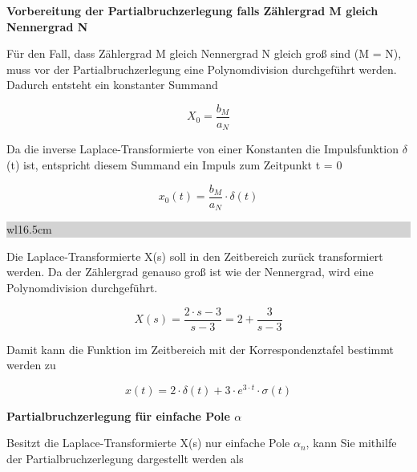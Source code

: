 {\selectfont
\noindent\textbf{Vorbereitung der Partialbruchzerlegung falls Zählergrad M gleich Nennergrad N}}\smallskip

\noindent Für den Fall, dass Zählergrad M gleich Nennergrad N gleich gro{\ss} sind (M = N), muss vor der Partialbruchzerlegung eine Polynomdivision durchgeführt werden. Dadurch entsteht ein konstanter Summand 

\begin{equation}\label{eq:fourhundredtwelve}
X_{0} =\frac{b_{M} }{a_{N} } 
\end{equation}

\noindent Da die inverse Laplace-Transformierte von einer Konstanten die Impulsfunktion $\delta$(t) ist, entspricht diesem Summand ein Impuls zum Zeitpunkt t = 0

\begin{equation}\label{eq:fourhundredthirteen}
x_{0} \left(t\right)=\frac{b_{M} }{a_{N} } \cdot \delta \left(t\right)
\end{equation}\bigskip

\noindent
\colorbox{lightgray}{%
%
\renewcommand\arraystretch{0.6}%
\begin{tabular}{ wl{16.5cm} }
{\selectfont{Beispiel: Zählergrad gleich Nennergrad} }
\end{tabular}%
}\bigskip

\noindent Die Laplace-Transformierte X(s) soll in den Zeitbereich zurück transformiert werden. Da der Zählergrad genauso gro{\ss} ist wie der Nennergrad, wird eine Polynomdivision durchgeführt.

\begin{equation}\label{eq:fourhundredfourteen}
X\left(s\right)=\frac{2\cdot s-3}{s-3} =2+\frac{3}{s-3}
\end{equation}

\noindent Damit kann die Funktion im Zeitbereich mit der Korrespondenztafel bestimmt werden zu

\begin{equation}\label{eq:fourhundredfifteen}
x\left(t\right)=2\cdot \delta \left(t\right)+3\cdot e^{3\cdot t} \cdot \sigma \left(t\right)
\end{equation}\bigskip

{\selectfont
\noindent\textbf{Partialbruchzerlegung für einfache Pole $\alpha$}}\smallskip

\noindent Besitzt die Laplace-Transformierte X(s) nur einfache Pole $\alpha_{n}$, kann Sie mithilfe der Partialbruchzerlegung dargestellt werden als

